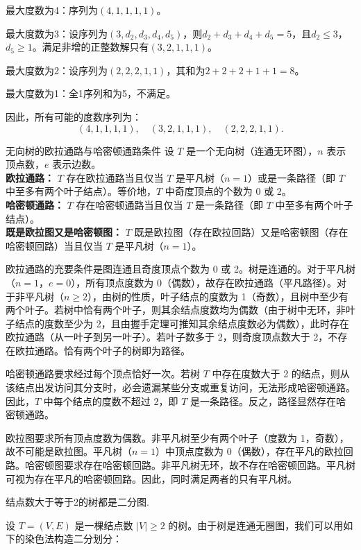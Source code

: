 最大度数为4：序列为$(4,1,1,1,1)$。
 
最大度数为3：设序列为$(3, d_2, d_3, d_4, d_5)$，则$d_2 + d_3 + d_4 + d_5 = 5$，且$d_2 \le 3$，$d_5 \ge 1$。满足非增的正整数解只有$(3,2,1,1,1)$。

最大度数为2：设序列为$(2,2,2,1,1)$，其和为$2+2+2+1+1=8$。

最大度数为1：全1序列和为5，不满足。

因此，所有可能的度数序列为：
\[
(4,1,1,1,1), \quad (3,2,1,1,1), \quad (2,2,2,1,1).
\]
\begin{theorem}{无向树的欧拉通路与哈密顿通路条件}{}
设 $T$ 是一个无向树（连通无环图），$n$ 表示顶点数，$e$ 表示边数。\\
\textbf{欧拉通路：} $T$ 存在欧拉通路当且仅当 $T$ 是平凡树（$n=1$）或是一条路径（即 $T$ 中至多有两个叶子结点）。等价地，$T$ 中奇度顶点的个数为 0 或 2。\\
\textbf{哈密顿通路：} $T$ 存在哈密顿通路当且仅当 $T$ 是一条路径（即 $T$ 中至多有两个叶子结点）。\\
\textbf{既是欧拉图又是哈密顿图：} $T$ 既是欧拉图（存在欧拉回路）又是哈密顿图（存在哈密顿回路）当且仅当 $T$ 是平凡树（$n=1$）。
\end{theorem}
欧拉通路的充要条件是图连通且奇度顶点个数为 0 或 2。树是连通的。对于平凡树（$n=1$，$e=0$），所有顶点度数为 0（偶数），故存在欧拉通路（平凡路径）。对于非平凡树（$n\ge 2$），由树的性质，叶子结点的度数为 1（奇数），且树中至少有两个叶子。若树中恰有两个叶子，则其余结点度数均为偶数（由于树中无环，非叶子结点的度数至少为 2，且由握手定理可推知其余结点度数必为偶数），此时存在欧拉通路（从一叶子到另一叶子）。若叶子数多于 2，则奇度顶点数大于 2，不存在欧拉通路。恰有两个叶子的树即为路径。

哈密顿通路要求经过每个顶点恰好一次。若树 $T$ 中存在度数大于 2 的结点，则从该结点出发访问其分支时，必会遗漏某些分支或重复访问，无法形成哈密顿通路。因此，$T$ 中每个结点的度数不超过 2，即 $T$ 是一条路径。反之，路径显然存在哈密顿通路。

欧拉图要求所有顶点度数为偶数。非平凡树至少有两个叶子（度数为 1，奇数），故不可能是欧拉图。平凡树（$n=1$）中顶点度数为 0（偶数），存在平凡的欧拉回路。哈密顿图要求存在哈密顿回路。非平凡树无环，故不存在哈密顿回路。平凡树可视为存在平凡的哈密顿回路。因此，同时满足两者的只有平凡树。
\begin{theorem}{}{}
结点数大于等于2的树都是二分图.
\end{theorem}
设 \(T = (V, E)\) 是一棵结点数 \(|V| \ge 2\) 的树。由于树是连通无圈图，我们可以用如下的染色法构造二分划分：

